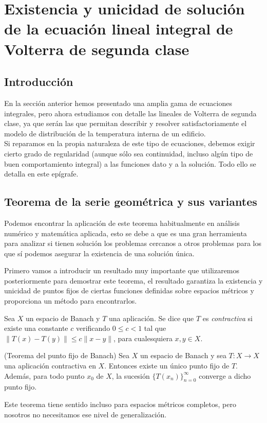 \chapter{Existencia y unicidad de solución de la ecuación lineal integral de Volterra de segunda clase}
\section{Introducción}
En la sección anterior hemos presentado una amplia gama de ecuaciones integrales, pero ahora estudiamos con detalle las lineales de Volterra de segunda clase, ya que serán las que permitan describir y resolver satisfactoriamente el modelo de distribución de la temperatura interna de un edificio.\\ Si reparamos en la propia naturaleza de este tipo de ecuaciones, debemos exigir cierto grado de regularidad (aunque sólo sea continuidad, incluso algún tipo de buen comportamiento integral) a las funciones dato y a la solución. Todo ello se detalla en este epígrafe.
\section{Teorema de la serie geométrica y sus variantes}
Podemos encontrar la aplicación de este teorema habitualmente en análisis numérico y matemática aplicada, esto se debe a que es una gran herramienta para analizar si tienen solución los problemas cercanos a otros problemas para los que sí podemos asegurar la existencia de una solución única.

Primero vamos a introducir un resultado muy importante que utilizaremos posteriormente para demostrar este teorema, el resultado garantiza la existencia y unicidad de puntos fijos de ciertas funciones definidas sobre espacios métricos y proporciona un método para encontrarlos.
\begin{definicion}
	Sea $X$ un espacio de Banach y $T$ una aplicación. Se dice que $T$ es \textit{contractiva} si existe una constante $c$ verificando $0 \leqslant c < 1$ tal que $\lVert T(x) - T(y) \rVert \leqslant c \lVert x-y \rVert$, para cualesquiera $x, y \in X$.
\end{definicion}
\begin{teorema}
	(Teorema del punto fijo de Banach) Sea $X$ un espacio de Banach y sea $T:X \rightarrow X$ una aplicación contractiva en $X$. Entonces existe un único punto fijo de $T$.\\
	Además, para todo punto $x_0$ de $X$, la sucesión $\{T(x_{n})\}_{n=0}^\infty$ converge a dicho punto fijo.
\end{teorema}
Este teorema tiene sentido incluso para espacios métricos completos, pero nosotros no necesitamos ese nivel de generalización. 

